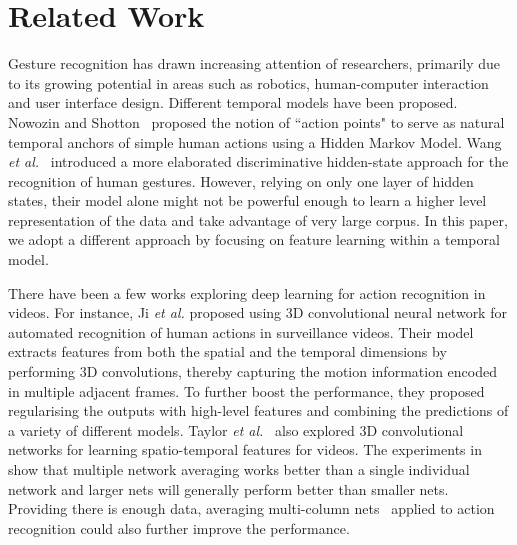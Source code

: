 
\section{Related Work}
\label{sec:relatedwork}

Gesture recognition has drawn increasing attention of researchers, primarily due to its growing potential in areas such as robotics, human-computer interaction and user interface design. Different temporal models have been proposed.
Nowozin and Shotton~\cite{nowozin2012action} proposed the notion of ``action points" to serve as natural temporal anchors of simple human actions using a Hidden Markov Model.
Wang \emph{et al.}~\cite{wang2006hidden} introduced a more elaborated discriminative hidden-state approach for the recognition of human gestures.
However, relying on only one layer of hidden states,
their model alone might not  be powerful enough to learn a higher level representation of the data and take advantage of very large corpus. In this paper, we adopt a different approach by focusing on feature learning within a temporal model.

There have been a few works exploring deep learning for action recognition in videos. For instance, Ji \emph{et al.}\cite{ji20133d} proposed using 3D convolutional neural network for automated recognition of human actions in surveillance videos. Their model extracts features from both the spatial and the temporal dimensions by performing 3D convolutions, thereby capturing the motion information encoded in multiple adjacent frames. To further boost the performance, they proposed regularising the outputs with high-level features and combining the predictions of a variety of different models. Taylor \emph{et al.}~\cite{taylor2010convolutional}  also explored 3D convolutional networks for learning spatio-temporal features for videos. The experiments in~\cite{wu2014deep} show that multiple network averaging works better than a single individual network and larger nets  will generally perform better than smaller nets.
Providing there is enough data, averaging multi-column nets~\cite{ciresan2012multi} applied to
action recognition could also further improve the performance.

